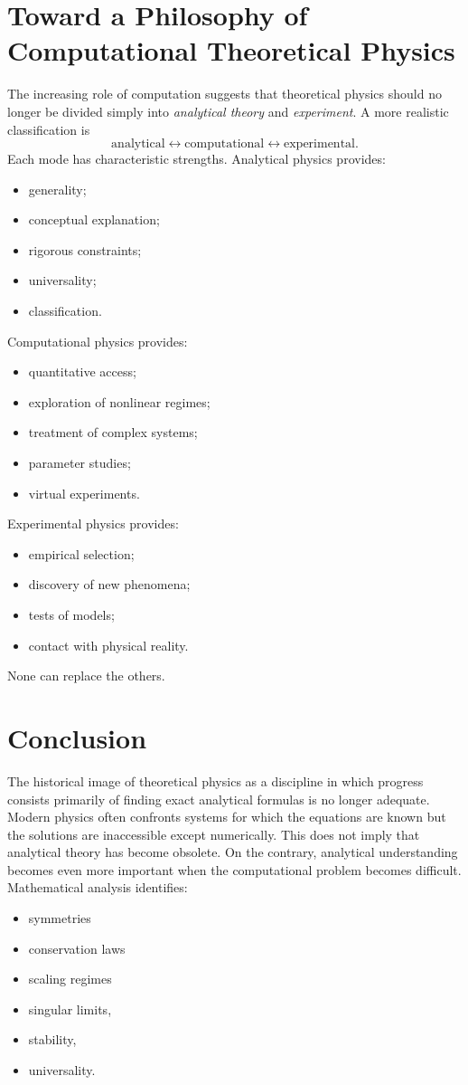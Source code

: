 \section{ Toward a Philosophy of Computational Theoretical Physics}
\label{nm:ctp}

The increasing role of computation suggests that theoretical physics should no
longer be divided simply into
\emph{analytical theory} and \emph{experiment}.
A more realistic classification is
\[\boxed{\text{analytical}\leftrightarrow\text{computational}
\leftrightarrow\text{experimental}.}\]
Each mode has characteristic strengths.
Analytical physics provides:
\begin{itemize}
\item generality;
\item conceptual explanation;
\item rigorous constraints;
\item universality;
\item classification.
\end{itemize}
Computational physics provides:
\begin{itemize}
\item quantitative access;
\item exploration of nonlinear regimes;
\item treatment of complex systems;
\item parameter studies;
\item virtual experiments.
\end{itemize}
Experimental physics provides:
\begin{itemize}
\item empirical selection;
\item discovery of new phenomena;
\item tests of models;
\item contact with physical reality.
\end{itemize}
None can replace the others.

\section{ Conclusion}
\label{nm:co}

The historical image of theoretical physics as a discipline in which progress
consists primarily of finding exact analytical formulas is no longer adequate.
Modern physics often confronts systems for which the equations are known but
the solutions are inaccessible except numerically. This does not imply that
analytical theory has become obsolete. On the contrary, analytical
understanding becomes even more important when the computational problem
becomes difficult.
Mathematical analysis identifies:
\begin{itemize}
   \item symmetries
   \item conservation laws
   \item scaling regimes
\item{singular limits},
\item{stability},
\item{universality}.
\end{itemize}

